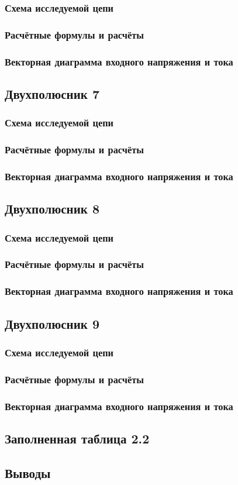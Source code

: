 \subsubsection{Схема исследуемой цепи}
\subsubsection{Расчётные формулы и расчёты}
\subsubsection{Векторная диаграмма входного напряжения и тока}

\subsection{Двухполюсник 7}
\subsubsection{Схема исследуемой цепи}
\subsubsection{Расчётные формулы и расчёты}
\subsubsection{Векторная диаграмма входного напряжения и тока}

\subsection{Двухполюсник 8}
\subsubsection{Схема исследуемой цепи}
\subsubsection{Расчётные формулы и расчёты}
\subsubsection{Векторная диаграмма входного напряжения и тока}

\subsection{Двухполюсник 9}
\subsubsection{Схема исследуемой цепи}
\subsubsection{Расчётные формулы и расчёты}
\subsubsection{Векторная диаграмма входного напряжения и тока}

\subsection{Заполненная таблица 2.2}

\subsection{Выводы}
